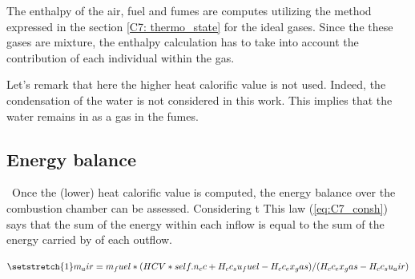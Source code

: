 The enthalpy of the air, fuel and fumes are computes utilizing the method expressed in the section \ref{C7: thermo_state} for the ideal gases. Since the these gases are mixture, the enthalpy calculation has to take into account the contribution of each individual within the gas.

Let's remark that here the higher heat calorific value is not used. Indeed, the condensation of the water is not considered in this work. This implies that the water remains in as a gas in the fumes.

\subsection{Energy balance}
\quad\ Once the (lower) heat calorific value is computed, the energy balance over the combustion chamber can be assessed. Considering t
This law (\ref{eq:C7_consh}) says that the sum of the energy within each inflow is equal to the sum of the energy carried by of each outflow. 

\begin{equation}
    \setstretch{1}
    m_air = m_fuel * (HCV * self.n_cc + H_cc_su_fuel - H_cc_ex_gas) / (H_cc_ex_gas - H_cc_su_air)
\end{equation}